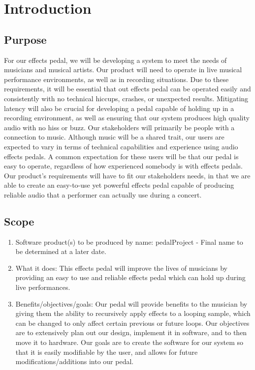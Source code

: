 \section{Introduction}
\subsection{Purpose}
For our effects pedal, we will be developing a system to meet the needs of musicians and musical artists. Our product will need to operate in live musical performance environments, as well as in recording situations. Due to these requirements, it will be essential that out effects pedal can be operated easily and consistently with no technical hiccups, crashes, or unexpected results. Mitigating latency will also be crucial for developing a pedal capable of holding up in a recording environment, as well as ensuring that our system produces high quality audio with no hiss or buzz. 
Our stakeholders will primarily be people with a connection to music. Although music will be a shared trait, our users are expected to vary in terms of technical capabilities and experience using audio effects pedals. A common expectation for these users will be that our pedal is easy to operate, regardless of how experienced somebody is with effects pedals.\\
Our product's requirements will have to fit our stakeholders needs, in that we are able to create an easy-to-use yet powerful effects pedal capable of producing reliable audio that a performer can actually use during a concert. 

\subsection{Scope}
    \begin{enumerate}[label=\alph*.]
        \item Software product(s) to be produced by name: pedalProject - Final name to be determined at a later date.
        \item What it does: This effects pedal will improve the lives of musicians by providing an easy to use and reliable effects pedal which can hold up during live performances.
        \item Benefits/objectives/goals: Our pedal will provide benefits to the musician by giving them the ability to recursively apply effects to a looping sample, which can be changed to only affect certain previous or future loops. Our objectives are to extensively plan out our design, implement it in software, and to then move it to hardware. Our goals are to create the software for our system so that it is easily modifiable by the user, and allows for future modifications/additions into our pedal.
\end{enumerate}

